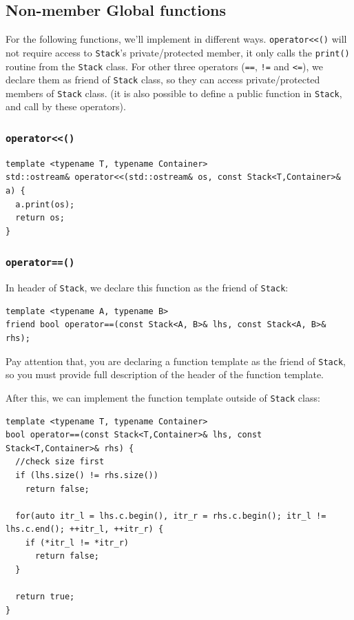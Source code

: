 \documentclass[11pt]{book}
\begin{document}
\subsection{Non-member Global functions}
\label{sec:org860d94f}
For the following functions, we'll implement in different ways. \texttt{operator<<()} will not require access to \texttt{Stack}'s private/protected member, it only calls the \texttt{print()} routine from the \texttt{Stack} class. For other three operators (\texttt{==}, \texttt{!=} and \texttt{<=}), we declare them as friend of \texttt{Stack} class, so they can access private/protected members of \texttt{Stack} class. (it is also possible to define a public function in \texttt{Stack}, and call by these operators).
\subsubsection{\texttt{operator<<()}}
\label{sec:org3ab7f89}
\begin{verbatim}
template <typename T, typename Container>
std::ostream& operator<<(std::ostream& os, const Stack<T,Container>& a) {
  a.print(os);
  return os;
}
\end{verbatim}
\subsubsection{\texttt{operator==()}}
\label{sec:org075481e}
In header of \texttt{Stack}, we declare this function as the friend of \texttt{Stack}:
\begin{verbatim}
template <typename A, typename B>
friend bool operator==(const Stack<A, B>& lhs, const Stack<A, B>& rhs);
\end{verbatim}

Pay attention that, you are declaring a function template as the friend of \texttt{Stack}, so you must provide full description of the header of the function template.

After this, we can implement the function template outside of \texttt{Stack} class:
\begin{verbatim}
template <typename T, typename Container>
bool operator==(const Stack<T,Container>& lhs, const Stack<T,Container>& rhs) {
  //check size first
  if (lhs.size() != rhs.size())
    return false;

  for(auto itr_l = lhs.c.begin(), itr_r = rhs.c.begin(); itr_l != lhs.c.end(); ++itr_l, ++itr_r) {
    if (*itr_l != *itr_r)
      return false;
  }

  return true;
}
\end{verbatim}
\end{document}
